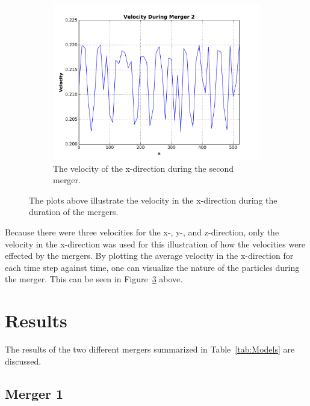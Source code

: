 \documentclass[12pt]{report}
\begin{document}
\begin{figure}[H]
\begin{subfigure}[b]{.475\textwidth}
        \label{fig:velcoity_merger1}
    \end{subfigure} %
    \hfill
    \begin{subfigure}[b]{.475\textwidth}
        \centering
        \includegraphics[width=\linewidth]{velocity_merger2.png}
        \caption[]%
        {{The velocity of the x-direction during the second merger.}}
        \label{fig:velocity_merger2}
    \end{subfigure} %
    \caption[]
        {The plots above illustrate the velocity in the x-direction during the duration of the mergers.} 
        \label{fig:velocity_of_mergers}
\end{figure}

Because there were three velocities for the x-, y-, and z-direction, only the velocity in the x-direction was used for this illustration of how the velocities were effected by the mergers. By plotting the average velocity in the x-direction for each time step against time, one can visualize the nature of the particles during the merger. This can be seen in Figure~\ref{fig:velocity_of_mergers} above.





\section*{Results} \label{sec:Results}

The results of the two different mergers summarized in Table~\ref{tab:Models} are discussed. 

\subsection*{Merger 1}
\end{document}
